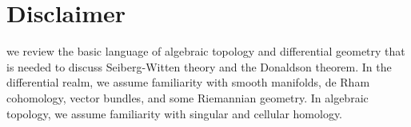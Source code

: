 \chapter*{Disclaimer}

 we review the basic language of algebraic topology and differential geometry that is needed to discuss Seiberg-Witten theory and the Donaldson theorem. In the differential realm, we assume familiarity with smooth manifolds, de Rham cohomology, vector bundles, and some Riemannian geometry. In algebraic topology, we assume familiarity with singular and cellular homology.